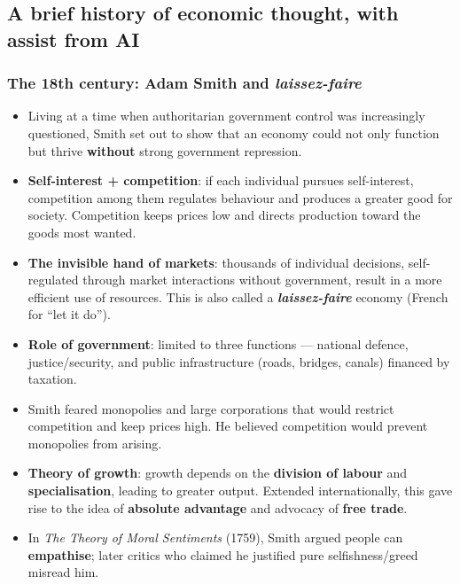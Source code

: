 \documentclass[a4paper,12pt]{article}
\begin{document}
\subsection{A brief history of economic thought, with assist from AI}
\subsubsection*{The 18th century: Adam Smith and \textit{laissez-faire}}
\begin{itemize}
  \item Living at a time when authoritarian government control was increasingly questioned, Smith set out to show that an economy could not only function but thrive \textbf{without} strong government repression.
  \item \textbf{Self-interest + competition}: if each individual pursues self-interest, competition among them regulates behaviour and produces a greater good for society. Competition keeps prices low and directs production toward the goods most wanted.
  \item \textbf{The invisible hand of markets}: thousands of individual decisions, self-regulated through market interactions without government, result in a more efficient use of resources. This is also called a \textbf{\textit{laissez-faire}} economy (French for ``let it do'').
  \item \textbf{Role of government}: limited to three functions --- national defence, justice/security, and public infrastructure (roads, bridges, canals) financed by taxation.
  \item Smith feared monopolies and large corporations that would restrict competition and keep prices high. He believed competition would prevent monopolies from arising.
  \item \textbf{Theory of growth}: growth depends on the \textbf{division of labour} and \textbf{specialisation}, leading to greater output. Extended internationally, this gave rise to the idea of \textbf{absolute advantage} and advocacy of \textbf{free trade}.
  \item In \textit{The Theory of Moral Sentiments} (1759), Smith argued people can \textbf{empathise}; later critics who claimed he justified pure selfishness/greed misread him.
\end{itemize}
\end{document}
